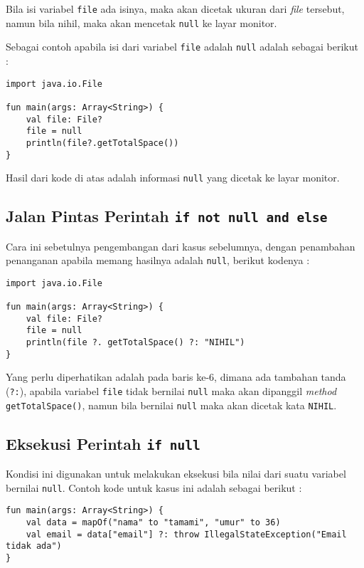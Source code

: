 Bila isi variabel \texttt{file} ada isinya, maka akan dicetak ukuran dari \textit{file} tersebut, namun bila nihil, maka akan mencetak \texttt{null} ke layar monitor.

Sebagai contoh apabila isi dari variabel \texttt{file} adalah \texttt{null} adalah sebagai berikut :

\begin{lstlisting}
import java.io.File

fun main(args: Array<String>) {
	val file: File?
	file = null
	println(file?.getTotalSpace())
}
\end{lstlisting}

Hasil dari kode di atas adalah informasi \texttt{null} yang dicetak ke layar monitor.

\subsection{Jalan Pintas Perintah \texttt{if not null and else}}

Cara ini sebetulnya pengembangan dari kasus sebelumnya, dengan penambahan penanganan apabila memang hasilnya adalah \texttt{null}, berikut kodenya :

\begin{lstlisting}
import java.io.File

fun main(args: Array<String>) {
	val file: File?
	file = null
	println(file ?. getTotalSpace() ?: "NIHIL")
}
\end{lstlisting}

Yang perlu diperhatikan adalah pada baris ke-6, dimana ada tambahan tanda (\texttt{?:}), apabila variabel \texttt{file} tidak bernilai \texttt{null} maka akan dipanggil \textit{method} \texttt{getTotalSpace()}, namun bila bernilai \texttt{null} maka akan dicetak kata \texttt{NIHIL}.

\subsection{Eksekusi Perintah \texttt{if null}}

Kondisi ini digunakan untuk melakukan eksekusi bila nilai dari suatu variabel bernilai \texttt{null}. Contoh kode untuk kasus ini adalah sebagai berikut :

\begin{lstlisting}
fun main(args: Array<String>) {
	val data = mapOf("nama" to "tamami", "umur" to 36)
	val email = data["email"] ?: throw IllegalStateException("Email tidak ada")
}
\end{lstlisting}

